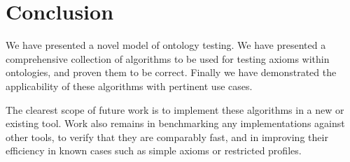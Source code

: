 \documentclass[paper.tex]{subfiles}
\begin{document}
\section{Conclusion}
\label{sec:conclusion}

We have presented a novel model of ontology testing.
We have presented a comprehensive collection of algorithms to be used for testing axioms within ontologies, and proven them to be correct.
Finally we have demonstrated the applicability of these algorithms with pertinent use cases.

The clearest scope of future work is to implement these algorithms in a new or existing tool.
Work also remains in benchmarking any implementations against other tools, to verify that they are comparably fast, and in improving their efficiency in known cases such as simple axioms or restricted profiles.
\end{document}

